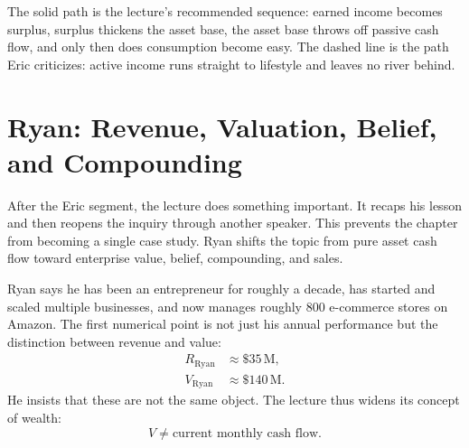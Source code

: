 \begin{figure}
\centering
{}
\end{figure}

The solid path is the lecture's recommended sequence: earned income becomes surplus, surplus thickens the asset base, the asset base throws off passive cash flow, and only then does consumption become easy. The dashed line is the path Eric criticizes: active income runs straight to lifestyle and leaves no river behind.

\section{Ryan: Revenue, Valuation, Belief, and Compounding}

After the Eric segment, the lecture does something important. It recaps his lesson and then reopens the inquiry through another speaker. This prevents the chapter from becoming a single case study. Ryan shifts the topic from pure asset cash flow toward enterprise value, belief, compounding, and sales.

Ryan says he has been an entrepreneur for roughly a decade, has started and scaled multiple businesses, and now manages roughly \(800\) e-commerce stores on Amazon. The first numerical point is not just his annual performance but the distinction between revenue and value:
\begin{align}
R_{\text{Ryan}} &\approx \$35\,\text{M},\\
V_{\text{Ryan}} &\approx \$140\,\text{M}.
\end{align}
He insists that these are not the same object. The lecture thus widens its concept of wealth:
\begin{equation}
V \neq \text{current monthly cash flow}.
\end{equation}


